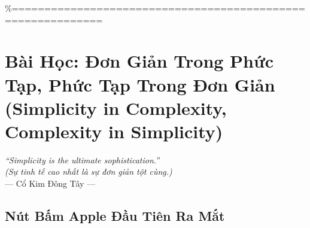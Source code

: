 \%============================================================
\chapter{Bài Học: Đơn Giản Trong Phức Tạp, Phức Tạp Trong Đơn Giản (Simplicity in Complexity, Complexity in Simplicity)}
\begin{center}
  \textit{\color{truyengold}``Simplicity is the ultimate sophistication.''}\\[4pt]
  \textit{(Sự tinh tế cao nhất là sự đơn giản tột cùng.)}\\[4pt]
  \small\color{truyenblue}--- Cổ Kim Đông Tây ---
\end{center}
\ngancach

\section{Nút Bấm Apple Đầu Tiên Ra Mắt}
